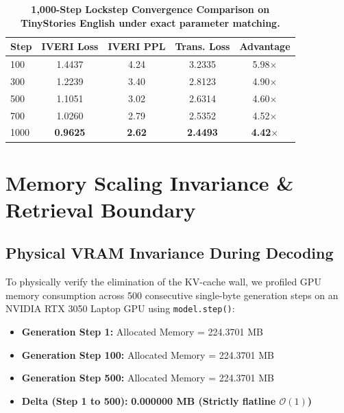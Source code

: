 \documentclass[10pt,twocolumn,letterpaper]{article}
\begin{document}
\begin{table}[h]
\centering
\small
\caption{\textbf{1,000-Step Lockstep Convergence Comparison on TinyStories English under exact parameter matching.}}
\label{tab:convergence}
\begin{tabular}{lcccc}
\toprule
\textbf{Step} & \textbf{IVERI Loss} & \textbf{IVERI PPL} & \textbf{Trans. Loss} & \textbf{Advantage} \\
\midrule
100 & 1.4437 & 4.24 & 3.2335 & 5.98$\times$ \\
300 & 1.2239 & 3.40 & 2.8123 & 4.90$\times$ \\
500 & 1.1051 & 3.02 & 2.6314 & 4.60$\times$ \\
700 & 1.0260 & 2.79 & 2.5352 & 4.52$\times$ \\
1000 & \textbf{0.9625} & \textbf{2.62} & \textbf{2.4493} & \textbf{4.42$\times$} \\
\bottomrule
\end{tabular}
\end{table}

\section{Memory Scaling Invariance \& Retrieval Boundary}
\label{sec:memory}

\subsection{Physical VRAM Invariance During Decoding}
To physically verify the elimination of the KV-cache wall, we profiled GPU memory consumption across 500 consecutive single-byte generation steps on an NVIDIA RTX 3050 Laptop GPU using \texttt{model.step()}:
\begin{itemize}[leftmargin=*]
    \item \textbf{Generation Step 1:} Allocated Memory = 224.3701 MB
    \item \textbf{Generation Step 100:} Allocated Memory = 224.3701 MB
    \item \textbf{Generation Step 500:} Allocated Memory = 224.3701 MB
    \item \textbf{Delta (Step 1 to 500):} \textbf{0.000000 MB (Strictly flatline $\mathcal{O}(1)$)}
\end{itemize}
\end{document}
